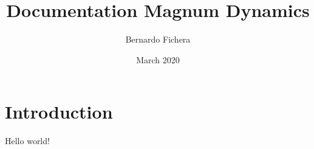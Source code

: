 \documentclass[12pt]{article}
\title{Documentation Magnum Dynamics}
\author{Bernardo Fichera}
\date{March 2020}
\begin{document}
\maketitle

\section*{Introduction}

Hello world!
\end{document}
